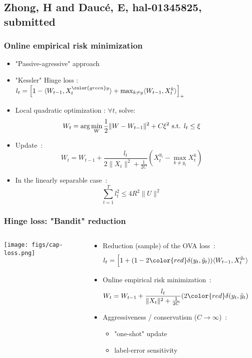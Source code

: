 \documentclass{beamer}
\begin{document}
\subsection{Zhong, H and Daucé, E, hal-01345825, submitted}

\begin{frame}
	\tableofcontents[currentsubsection]
\end{frame} 


\begin{frame}\frametitle{Online empirical risk minimization}
	\footnotesize
	\begin{itemize}
		\item "Passive-agressive" approach \cite{crammer2006online}
		\item "Kessler" Hinge loss : $l_t =  \left[ 1 -  \langle W_{t-1}, X^{\color{green}y}_t \rangle + \max_{k \neq y} \langle W_{t-1}, X_t^k\rangle\right]_+$
		\item Local quadratic optimization : $\forall t$, solve: 
		$$W_{t} = \arg \min_W \frac{1}{2} \| W - W_{t-1}\|^2 + C \xi^2 \hbox{ s.t. } l_t \leq \xi$$
		\item Update~:
		$$W_{t} =  W_{t-1} + \frac{l_t}{2\|X_t\|^2 + \frac{1}{2C}}  (X_t^{y_t} - \max_{k \neq y_t} X_t^k)$$
		\item In the linearly separable case~:
		$$\sum_{t=1}^{T} l_t^2 \leqslant 4 R^2 \parallel{U}\parallel^2$$
	\end{itemize}
	\normalsize
\end{frame}


\begin{frame}\frametitle{Hinge loss: "Bandit" reduction}
	\begin{columns}
		\begin{column}{.2 \linewidth}
			\centerline{\texttt{[image: figs/cap-loss.png]}}
		\end{column}
		\begin{column}{.8 \linewidth}
			\begin{itemize}
				\item Reduction (sample) of the OVA loss~: 
				$$l_t =  \left[1 + (1 - 2 {\color{red}\delta(y_t,\tilde{y}_t)}) \langle W_{t-1}, X_t^{\tilde{y}_t}\rangle\right]_+$$

				\item Online empirical risk minimization~:
				$$W_{t} =  W_{t-1} + \frac{l_t}{\|X_t\|^2 + \frac{1}{2C}}  (2 {\color{red}\delta(y_t,\tilde{y}_t)} - 1) X_t^{\tilde{y}_t}$$		
				\item Aggressiveness / conservatism ($C \rightarrow \infty$)~:
				\begin{itemize}
					\item "one-shot" update
					\item label-error sensitivity
				\end{itemize}	
			\end{itemize}
		\end{column}
	\end{columns}
\end{frame}
\end{document}
